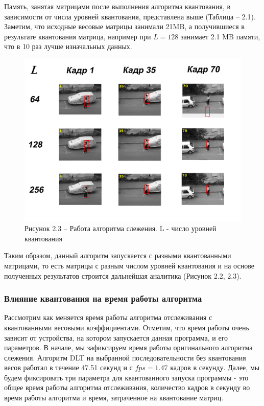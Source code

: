 Память, занятая матрицами после выполнения алгоритма квантования, в зависимости от числа уровней квантования, представлена выше (Таблица -- 2.1). Заметим, что исходные весовые матрицы занимали 21MB, а получившиеся в результате квантования матрица, например при $L=128$ занимает 2.1 MB памяти, что в 10 раз лучше изначальных данных. 

\begin{figure}[h!]
    \centering
    \includegraphics[width = 14 cm]{tests/img/Bez_imeni-2.jpg}
    \caption*{Рисунок 2.3 -- Работа алгоритма слежения. L - число уровней квантования}
\end{figure}

Таким образом, данный алгоритм запускается с разными квантованными матрицами, то есть матрицы с разным числом уровней квантования и на основе полученных результатов строится дальнейшая аналитика (Рисунок 2.2, 2.3). 

\subsubsection{Влияние квантования на время работы алгоритма}

Рассмотрим как меняется время работы алгоритма отслеживания с квантованными весовыми коэффициентами. Отметим, что время работы очень зависит от устройства, на котором запускается данная программа, и его параметров. В начале, мы зафиксируем время работы оригинального алгоритма слежения. Алгоритм DLT на выбранной последовательности без квантования весов работал в течение 47.51 секунд и с $fps = 1.47$ кадров в секунду. Далее, мы будем фиксировать три параметра для квантованного запуска программы - это общее время работы алгоритма отслеживания, количество кадров в секунду во время работы алгоритма и время, затраченное на квантование матриц.

